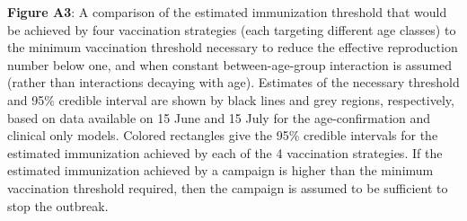 \textbf{Figure A3}: A comparison of the estimated immunization threshold that would be achieved by four vaccination strategies (each targeting different age classes) to the minimum vaccination threshold necessary to reduce the effective reproduction number below one, and when constant between-age-group interaction is assumed (rather than interactions decaying with age). Estimates of the necessary threshold and 95\% credible interval are shown by black lines and grey regions, respectively, based on data available on 15 June and 15 July for the age-confirmation and clinical only models.  Colored rectangles give the 95\% credible intervals for the estimated immunization achieved by each of the 4 vaccination strategies. If the estimated immunization achieved by a campaign is higher than the minimum vaccination threshold required, then the campaign is assumed to be sufficient to stop the outbreak.